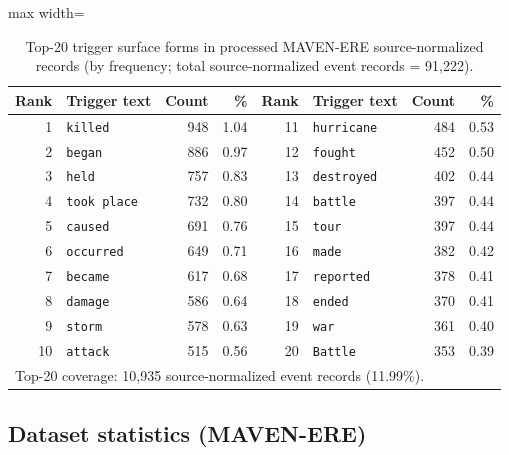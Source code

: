 \documentclass{article}
\begin{document}
\begin{table}[t]
\centering
\caption{Top-20 trigger surface forms in processed MAVEN-ERE source-normalized records (by frequency; total source-normalized event records = 91{,}222).}
\label{tab:app_mavenere_top20_triggers}
\small
\begin{adjustbox}{max width=\linewidth}
\begin{tabular}{r l r r | r l r r}
\hline
Rank & Trigger text & Count & \% & Rank & Trigger text & Count & \% \\
\hline
1  & \texttt{killed}      & 948 & 1.04 & 11 & \texttt{hurricane}  & 484 & 0.53 \\
2  & \texttt{began}       & 886 & 0.97 & 12 & \texttt{fought}     & 452 & 0.50 \\
3  & \texttt{held}        & 757 & 0.83 & 13 & \texttt{destroyed}  & 402 & 0.44 \\
4  & \texttt{took place}  & 732 & 0.80 & 14 & \texttt{battle}     & 397 & 0.44 \\
5  & \texttt{caused}      & 691 & 0.76 & 15 & \texttt{tour}       & 397 & 0.44 \\
6  & \texttt{occurred}    & 649 & 0.71 & 16 & \texttt{made}       & 382 & 0.42 \\
7  & \texttt{became}      & 617 & 0.68 & 17 & \texttt{reported}   & 378 & 0.41 \\
8  & \texttt{damage}      & 586 & 0.64 & 18 & \texttt{ended}      & 370 & 0.41 \\
9  & \texttt{storm}       & 578 & 0.63 & 19 & \texttt{war}        & 361 & 0.40 \\
10 & \texttt{attack}      & 515 & 0.56 & 20 & \texttt{Battle}     & 353 & 0.39 \\
\hline
\multicolumn{8}{l}{Top-20 coverage: 10{,}935 source-normalized event records (11.99\%).} \\
\hline
\end{tabular}
\end{adjustbox}
\end{table}

\subsection{Dataset statistics (MAVEN-ERE)}
\label{sec:app_mavenere_stats}
\end{document}
